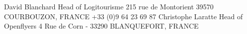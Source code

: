 \cventry
{David Blanchard}
{Head of Logitourisme}
{}
{}
{}
{	
	215 rue de Montorient 39570 COURBOUZON, FRANCE
	\newline \fixedphonesymbol  +33 (0)9 64 23 69 87
	\newline \emailsymbol {}
}
\cventry
{Christophe Laratte}
{Head of Openflyers}
{}
{}
{}
{	
	4 Rue de Corn - 33290 BLANQUEFORT, FRANCE
	\newline \emailsymbol {}
}